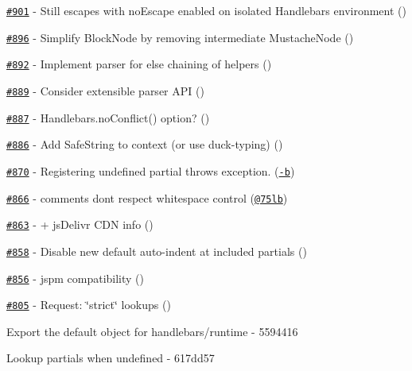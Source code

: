 \begin{DoxyItemize}
\item \href{https://github.com/wycats/handlebars.js/issues/901}{\tt \#901} -\/ Still escapes with no\+Escape enabled on isolated Handlebars environment (\href{https://api.github.com/users/zedknight}{\tt })
\item \href{https://github.com/wycats/handlebars.js/pull/896}{\tt \#896} -\/ Simplify Block\+Node by removing intermediate Mustache\+Node (\href{https://api.github.com/users/mmun}{\tt })
\item \href{https://github.com/wycats/handlebars.js/pull/892}{\tt \#892} -\/ Implement parser for else chaining of helpers (\href{https://api.github.com/users/kpdecker}{\tt })
\item \href{https://github.com/wycats/handlebars.js/issues/889}{\tt \#889} -\/ Consider extensible parser A\+PI (\href{https://api.github.com/users/kpdecker}{\tt })
\item \href{https://github.com/wycats/handlebars.js/issues/887}{\tt \#887} -\/ Handlebars.\+no\+Conflict() option? (\href{https://api.github.com/users/bradvogel}{\tt })
\item \href{https://github.com/wycats/handlebars.js/issues/886}{\tt \#886} -\/ Add Safe\+String to context (or use duck-\/typing) (\href{https://api.github.com/users/dominicbarnes}{\tt })
\item \href{https://github.com/wycats/handlebars.js/pull/870}{\tt \#870} -\/ Registering undefined partial throws exception. (\href{https://api.github.com/users/max-b}{\tt -\/b})
\item \href{https://github.com/wycats/handlebars.js/issues/866}{\tt \#866} -\/ comments don\textquotesingle{}t respect whitespace control (\href{https://api.github.com/users/75lb}{\tt @75lb})
\item \href{https://github.com/wycats/handlebars.js/pull/863}{\tt \#863} -\/ + js\+Delivr C\+DN info (\href{https://api.github.com/users/tomByrer}{\tt })
\item \href{https://github.com/wycats/handlebars.js/issues/858}{\tt \#858} -\/ Disable new default auto-\/indent at included partials (\href{https://api.github.com/users/majodev}{\tt })
\item \href{https://github.com/wycats/handlebars.js/pull/856}{\tt \#856} -\/ jspm compatibility (\href{https://api.github.com/users/MajorBreakfast}{\tt })
\item \href{https://github.com/wycats/handlebars.js/issues/805}{\tt \#805} -\/ Request\+: \char`\"{}strict\char`\"{} lookups (\href{https://api.github.com/users/nzakas}{\tt })
\item Export the default object for handlebars/runtime -\/ 5594416
\item Lookup partials when undefined -\/ 617dd57
\end{DoxyItemize}


